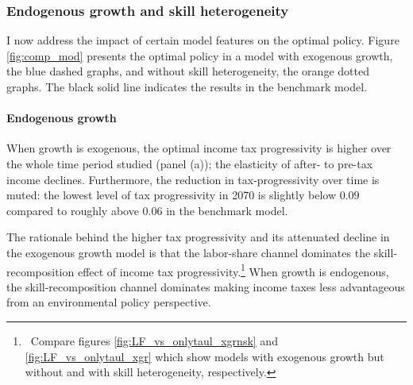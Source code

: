 \subsubsection{Endogenous growth and skill heterogeneity}\label{subsec:xgrnsk}

I now address the impact of certain model features on the optimal policy. 
Figure \ref{fig:comp_mod} presents the optimal policy in a model with exogenous growth, the blue dashed graphs, and without skill heterogeneity, the orange dotted graphs. The black solid line indicates the results in the benchmark model. 

\paragraph{Endogenous growth}
When growth is exogenous, the optimal income tax progressivity is higher over the whole time period studied (panel (a)); the elasticity of after- to pre-tax income declines. Furthermore, the reduction in tax-progressivity over time is muted: the lowest level of tax progressivity in 2070 is slightly below $0.09$ compared to roughly above $0.06$ in the benchmark model. 


The rationale behind the higher tax progressivity and its attenuated decline in the exogenous growth model is that the labor-share channel dominates the skill-recomposition effect of income tax progressivity.\footnote{\ Compare figures \ref{fig:LF_vs_onlytaul_xgrnsk} and \ref{fig:LF_vs_onlytaul_xgr} which show models with exogenous growth but without and with skill heterogeneity, respectively.}
When growth is endogenous, the skill-recomposition channel dominates making income taxes less advantageous from an environmental policy perspective.

